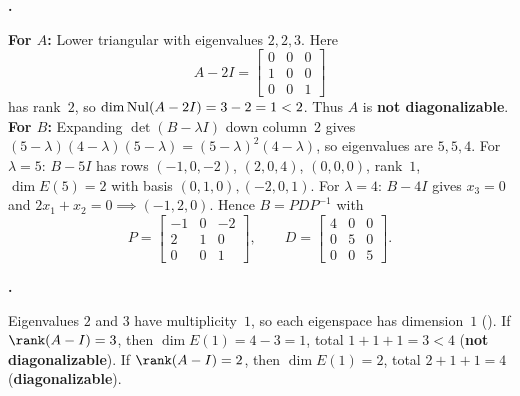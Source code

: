 \documentclass[10pt]{scrartcl}
\begin{document}
\begin{prob}\textbf{.}\par{}
\begin{steps}
  \ii \textbf{For $A$:} Lower triangular with eigenvalues $2,2,3$. Here
  \[
    A-2I=\begin{bmatrix}0&0&0\\1&0&0\\0&0&1\end{bmatrix}
  \]
  has rank~$2$, so $\dim\operatorname{Nul}(A-2I)=3-2=1<2$. Thus $A$ is \textbf{not diagonalizable}.
  \ii \textbf{For $B$:} Expanding $\det(B-\lambda I)$ down column~$2$ gives $(5-\lambda)(4-\lambda)(5-\lambda)=(5-\lambda)^2(4-\lambda)$, so eigenvalues are $5,5,4$.
  For $\lambda=5$: $B-5I$ has rows $(-1,0,-2)$, $(2,0,4)$, $(0,0,0)$, rank~$1$, $\dim E(5)=2$ with basis $(0,1,0),(-2,0,1)$.
  For $\lambda=4$: $B-4I$ gives $x_3=0$ and $2x_1+x_2=0 \implies (-1,2,0)$.
  Hence $B=PDP^{-1}$ with
  \[
    P=\begin{bmatrix}-1&0&-2\\2&1&0\\0&0&1\end{bmatrix},\qquad
    D=\begin{bmatrix}4&0&0\\0&5&0\\0&0&5\end{bmatrix}.
  \]
\end{steps}
\end{prob}

\begin{prob}\textbf{.}\par{}
Eigenvalues $2$ and $3$ have multiplicity~$1$, so each eigenspace has dimension~$1$ (). If $\rank(A-I)=3$, then $\dim E(1)=4-3=1$, total $1+1+1=3<4$ (\textbf{not diagonalizable}). If $\rank(A-I)=2$, then $\dim E(1)=2$, total $2+1+1=4$ (\textbf{diagonalizable}).
\end{prob}
\end{document}
